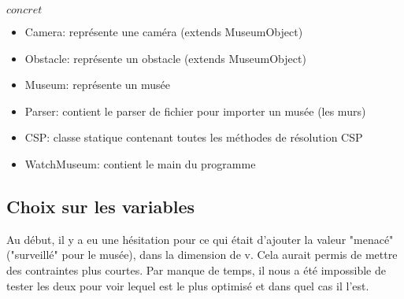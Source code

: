 $concret$
\begin{itemize}
    \item Camera: représente une caméra (extends MuseumObject)
    \item Obstacle: représente un obstacle (extends MuseumObject)
    \item Museum: représente un musée
    \item Parser: contient le parser de fichier pour importer un musée (les murs)
    \item CSP: classe statique contenant toutes les méthodes de résolution CSP
    \item WatchMuseum: contient le main du programme
\end{itemize}

\subsection{Choix sur les variables}
Au début, il y a eu une hésitation pour ce qui était d'ajouter la valeur "menacé" ("surveillé" pour le musée), dans la dimension de v. Cela aurait permis de mettre des contraintes plus courtes. Par manque de temps, il nous a été impossible de tester les deux pour voir lequel est le plus optimisé et dans quel cas il l'est.